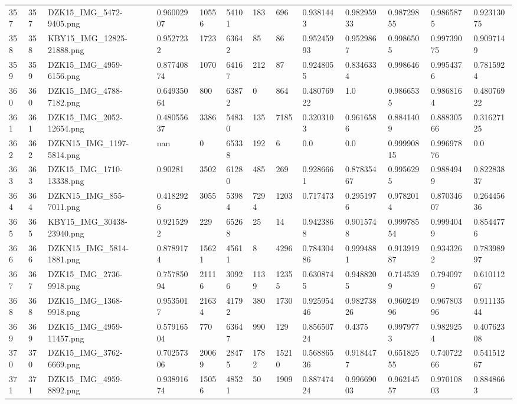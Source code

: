 \documentclass[11pt, a4paper, twoside]{report}
\begin{document}
\begin{longtable}[c]{@{}lllllllllllll@{}}
357 & 357 & DZK15\_IMG\_5472-9405.png & 0.96002907 & 10556 & 54101 & 183 & 696 & 0.9381443 & 0.98295933 & 0.98729855 & 0.9865875 & 0.92313075 \\
358 & 358 & KBY15\_IMG\_12825-21888.png & 0.9527232 & 1723 & 63642 & 85 & 86 & 0.95245993 & 0.9529867 & 0.9986505 & 0.99739075 & 0.9097149 \\
359 & 359 & DZK15\_IMG\_4959-6156.png & 0.87740874 & 1070 & 64167 & 212 & 87 & 0.9248055 & 0.8346334 & 0.998646 & 0.9954376 & 0.7815924 \\
360 & 360 & DZK15\_IMG\_4788-7182.png & 0.64935064 & 800 & 63872 & 0 & 864 & 0.48076922 & 1.0 & 0.9866535 & 0.9868164 & 0.48076922 \\
361 & 361 & DZK15\_IMG\_2052-12654.png & 0.48055637 & 3386 & 54830 & 135 & 7185 & 0.3203103 & 0.9616586 & 0.8841409 & 0.88830566 & 0.31627125 \\
362 & 362 & DZKN15\_IMG\_1197-5814.png & nan & 0 & 65338 & 192 & 6 & 0.0 & 0.0 & 0.99990815 & 0.99697876 & 0.0 \\
363 & 363 & DZK15\_IMG\_1710-13338.png & 0.90281 & 3502 & 61280 & 485 & 269 & 0.9286661 & 0.87835467 & 0.9956295 & 0.9884949 & 0.82283837 \\
364 & 364 & DZKN15\_IMG\_855-7011.png & 0.4182926 & 3055 & 53984 & 7294 & 1203 & 0.717473 & 0.2951976 & 0.9782014 & 0.87034607 & 0.26445636 \\
365 & 365 & KBY15\_IMG\_30438-23940.png & 0.9215292 & 229 & 65268 & 25 & 14 & 0.9423868 & 0.9015748 & 0.99978554 & 0.9994049 & 0.8544776 \\
366 & 366 & DZKN15\_IMG\_5814-1881.png & 0.8789174 & 15621 & 45611 & 8 & 4296 & 0.78430486 & 0.9994881 & 0.91391987 & 0.9343262 & 0.78398997 \\
367 & 367 & DZK15\_IMG\_2736-9918.png & 0.75785094 & 21116 & 30926 & 1139 & 12355 & 0.6308745 & 0.9488205 & 0.7145399 & 0.7940979 & 0.61011267 \\
368 & 368 & DZK15\_IMG\_1368-9918.png & 0.9535017 & 21634 & 41792 & 380 & 1730 & 0.92595446 & 0.98273826 & 0.96024996 & 0.96780396 & 0.91113544 \\
369 & 369 & DZK15\_IMG\_4959-11457.png & 0.57916504 & 770 & 63647 & 990 & 129 & 0.85650724 & 0.4375 & 0.9979773 & 0.9829254 & 0.40762308 \\
370 & 370 & DZK15\_IMG\_3762-6669.png & 0.70257306 & 20069 & 28475 & 1782 & 15210 & 0.56886536 & 0.9184477 & 0.65182555 & 0.74072266 & 0.54151267 \\
371 & 371 & DZK15\_IMG\_4959-8892.png & 0.93891674 & 15056 & 48521 & 50 & 1909 & 0.88747424 & 0.99669003 & 0.96214557 & 0.97010803 & 0.8848663 \\

\end{longtable}
\end{document}
